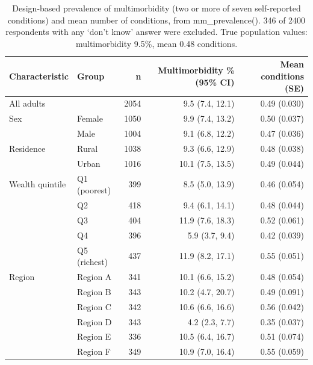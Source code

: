 \begin{table}

\caption{\label{tab:tab_multimorbidity}Design-based prevalence of multimorbidity (two or more of seven self-reported conditions) and mean number of conditions, from mm\_prevalence(). 346 of 2400 respondents with any `don't know' answer were excluded. True population values: multimorbidity 9.5\%, mean 0.48 conditions.}
\centering
\begin{tabular}[t]{llrrr}
\toprule
Characteristic & Group & n & Multimorbidity \% (95\% CI) & Mean conditions (SE)\\
\midrule
All adults &  & 2054 & 9.5 (7.4, 12.1) & 0.49 (0.030)\\
Sex & Female & 1050 & 9.9 (7.4, 13.2) & 0.50 (0.037)\\
 & Male & 1004 & 9.1 (6.8, 12.2) & 0.47 (0.036)\\
Residence & Rural & 1038 & 9.3 (6.6, 12.9) & 0.48 (0.038)\\
 & Urban & 1016 & 10.1 (7.5, 13.5) & 0.49 (0.044)\\
Wealth quintile & Q1 (poorest) & 399 & 8.5 (5.0, 13.9) & 0.46 (0.054)\\
 & Q2 & 418 & 9.4 (6.1, 14.1) & 0.48 (0.044)\\
 & Q3 & 404 & 11.9 (7.6, 18.3) & 0.52 (0.061)\\
 & Q4 & 396 & 5.9 (3.7, 9.4) & 0.42 (0.039)\\
 & Q5 (richest) & 437 & 11.9 (8.2, 17.1) & 0.55 (0.051)\\
Region & Region A & 341 & 10.1 (6.6, 15.2) & 0.48 (0.054)\\
 & Region B & 343 & 10.2 (4.7, 20.7) & 0.49 (0.091)\\
 & Region C & 342 & 10.6 (6.6, 16.6) & 0.56 (0.042)\\
 & Region D & 343 & 4.2 (2.3, 7.7) & 0.35 (0.037)\\
 & Region E & 336 & 10.5 (6.4, 16.7) & 0.51 (0.074)\\
 & Region F & 349 & 10.9 (7.0, 16.4) & 0.55 (0.059)\\
\bottomrule
\end{tabular}
\end{table}
